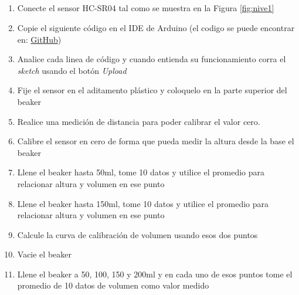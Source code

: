 \subsection{\pro}
\begin{enumerate}
    \item Conecte el sensor HC-SR04 tal como se muestra en la Figura \ref{fig:nive1}
    \item Copie el siguiente código en el IDE de Arduino (el codigo se puede encontrar en: \href{https://github.com/juanjorojash/instrumentacion_I/blob/master/algoritmos/nivel/nivel.ino}{GitHub})
      
    \item Analice cada linea de código y cuando entienda su funcionamiento corra el \emph{sketch} usando el botón \emph{Upload}
    \item Fije el sensor en el aditamento plástico y coloquelo en la parte superior del beaker  
    \item Realice una medición de distancia para poder calibrar el valor cero.
    \item Calibre el sensor en cero de forma que pueda medir la altura desde la base el beaker
    \item Llene el beaker hasta 50ml, tome 10 datos y utilice el promedio para relacionar altura y volumen en ese punto
    \item Llene el beaker hasta 150ml, tome 10 datos y utilice el promedio para relacionar altura y volumen en ese punto
    \item Calcule la curva de calibración de volumen usando esos dos puntos
    \item Vacie el beaker
    \item Llene el beaker a 50, 100, 150 y 200ml y en cada uno de esos puntos tome el promedio de 10 datos de volumen como valor medido
\end{enumerate}


